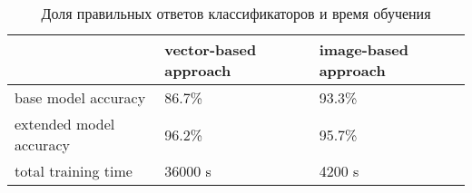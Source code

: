\begin{table}[h]
\begin{tabular}{|l|l|l|}
\hline
                        & vector-based approach & image-based approach \\ \hline
base model accuracy     & 86.7\%                & 93.3\%               \\ \hline
extended model accuracy & 96.2\%                 & 95.7\%               \\ \hline
total training time     & 36000 s               & 4200 s               \\ \hline
\end{tabular}
\caption{Доля правильных ответов классификаторов и время обучения}
\label{results_abfp}
\end{table}